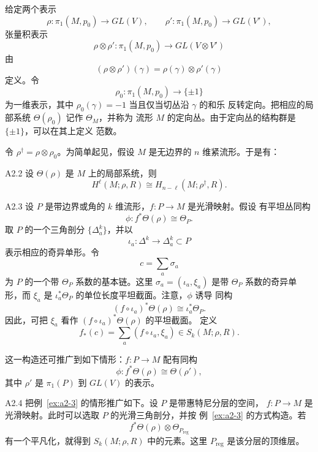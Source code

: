 给定两个表示
\[
 \rho\colon\pi_1(M,p_0)\longrightarrow GL(V),\qquad
 \rho'\colon\pi_1(M,p_0)\longrightarrow GL(V'),
\]
张量积表示
\[
 \rho\otimes\rho'\colon\pi_1(M,p_0)
 \longrightarrow GL(V\otimes V')
\]
由
\[
 (\rho\otimes\rho')(\gamma)=\rho(\gamma)\otimes\rho'(\gamma)
\]
定义。令
\[
 \rho_0\colon\pi_1(M,p_0)\longrightarrow\{\pm1\}
\]
为一维表示，其中 $\rho_0(\gamma)=-1$ 当且仅当切丛沿 $\gamma$ 的和乐
反转定向。把相应的局部系统 $\Theta(\rho_0)$ 记作 $\Theta_M$，并称为
流形 $M$ 的定向丛。由于定向丛的结构群是 $\{\pm1\}$，可以在其上定义
范数。

令 $\rho^\dagger=\rho\otimes\rho_0$。为简单起见，假设 $M$ 是无边界的
$n$ 维紧流形。于是有：

\begin{theorem}{A2.2}\label{thm:a2-2}
设 $\Theta(\rho)$ 是 $M$ 上的局部系统，则
\[
 H^\ell(M;\rho,R)\cong H_{n-\ell}(M;\rho^\dagger,R).
\]
\end{theorem}

\begin{example}{A2.3}\label{ex:a2-3}
设 $P$ 是带边界或角的 $k$ 维流形，$f\colon P\to M$ 是光滑映射。假设
有平坦丛同构
\[
 \phi\colon f^*\Theta(\rho)\cong\Theta_P.
\]
取 $P$ 的一个三角剖分 $\{\Delta_a^k\}$，并以
\[
 \iota_a\colon\Delta^k\longrightarrow\Delta_a^k\subset P
\]
表示相应的奇异单形。令
\[
 c=\sum_a\sigma_a
\]
为 $P$ 的一个带 $\Theta_P$ 系数的基本链。这里
$\sigma_a=(\iota_a,\xi_a)$ 是带 $\Theta_P$ 系数的奇异单形，而
$\xi_a$ 是 $\iota_a^*\Theta_P$ 的单位长度平坦截面。注意，$\phi$ 诱导
同构
\[
 (f\circ\iota_a)^*\Theta(\rho)\cong\iota_a^*\Theta_P.
\]
因此，可把 $\xi_a$ 看作 $(f\circ\iota_a)^*\Theta(\rho)$ 的平坦截面。%
定义
\[
 f_*(c)=\sum_a(f\circ\iota_a,\xi_a)\in S_k(M;\rho,R).
\]

这一构造还可推广到如下情形：$f\colon P\to M$ 配有同构
\[
 \phi\colon f^*\Theta(\rho)\cong\Theta(\rho'),
\]
其中 $\rho'$ 是 $\pi_1(P)$ 到 $GL(V)$ 的表示。
\end{example}

\begin{example}{A2.4}\label{ex:a2-4}
把例~\ref{ex:a2-3} 的情形推广如下。设 $P$ 是带惠特尼分层的空间，
$f\colon P\to M$ 是光滑映射。此时可以选取 $P$ 的光滑三角剖分，并按
例~\ref{ex:a2-3} 的方式构造。若
\[
 f^*\Theta(\rho)\otimes\Theta_{P_{\mathrm{reg}}}
\]
有一个平凡化，就得到 $S_k(M;\rho,R)$ 中的元素。这里
$P_{\mathrm{reg}}$ 是该分层的顶维层。
\end{example}

